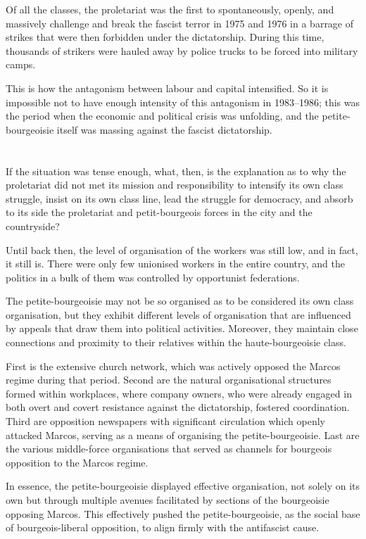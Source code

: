 Of all the classes, 
the proletariat was the first to spontaneously, openly, and massively 
challenge and break 
the fascist terror in 1975 and 1976 
in a barrage of strikes that 
were then forbidden under the dictatorship. 
During this time, 
thousands of strikers were 
hauled away by police trucks 
to be forced into military camps.

This is how the antagonism between labour and capital intensified. 
So it is impossible not to have enough 
intensity of this antagonism in 1983--1986;
this was the period when the economic and political crisis was unfolding,
and the petite-bourgeoisie itself was massing against the fascist dictatorship.

\section{}
If the situation was tense enough, 
what, then, is the explanation as to 
why the proletariat did not met its mission and responsibility 
to intensify its own class struggle, 
insist on its own class line, 
lead the struggle for democracy, 
and absorb to its side 
the proletariat and petit-bourgeois forces 
in the city and the countryside?

Until back then, 
the level of organisation of the workers was still low, 
and in fact, it still is. 
There were only few unionised workers in the entire country,
and the politics in a bulk of them was controlled by opportunist federations.

The petite-bourgeoisie may not be so organised 
as to be considered its own class organisation,
but they exhibit different levels of organisation 
that are influenced by appeals 
that draw them into political activities. 
Moreover, 
they maintain close connections and proximity 
to their relatives within the haute-bourgeoisie class.

First is the extensive church network,
which was actively opposed the Marcos regime during that period. 
Second are the natural organisational structures 
formed within workplaces, 
where company owners, who were already engaged 
in both overt and covert resistance 
against the dictatorship, fostered coordination. 
Third are opposition newspapers 
with significant circulation which openly attacked Marcos, 
serving as a means of organising the petite-bourgeoisie. 
Last are the various middle-force organisations 
that served as channels 
for bourgeois opposition to the Marcos regime.

In essence, 
the petite-bourgeoisie displayed effective organisation, 
not solely on its own 
but through multiple avenues facilitated 
by sections of the bourgeoisie opposing Marcos. 
This effectively pushed the petite-bourgeoisie, 
as the social base of bourgeois-liberal opposition, 
to align firmly with the antifascist cause.


